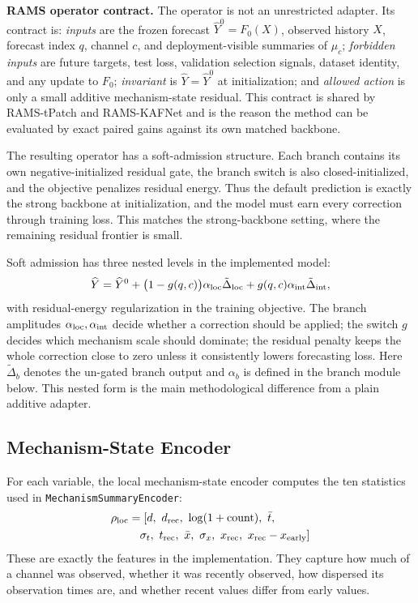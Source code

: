 ﻿\documentclass[10pt,conference]{IEEEtran}
\newcommand{\method}{\textnormal{\mbox{RAMS}}}
\newcommand{\tpatchinst}{\textnormal{\mbox{RAMS-tPatch}}}
\newcommand{\kafinst}{\textnormal{\mbox{RAMS-KAFNet}}}
\begin{document}
\textbf{\method{} operator contract.}
The operator is not an unrestricted adapter.  Its contract is:
\emph{inputs} are the frozen forecast \(\widehat Y^0=F_0(X)\), observed history
\(X\), forecast index \(q\), channel \(c\), and deployment-visible summaries of
\(\mu_c\); \emph{forbidden inputs} are future targets, test loss, validation
selection signals, dataset identity, and any update to \(F_0\);
\emph{invariant} is \(\widehat Y=\widehat Y^0\) at initialization; and
\emph{allowed action} is only a small additive mechanism-state residual.  This
contract is shared by \tpatchinst{} and \kafinst{} and is the reason the method
can be evaluated by exact paired gains against its own matched backbone.

The resulting operator has a soft-admission structure.  Each branch contains
its own negative-initialized residual gate, the
branch switch is also closed-initialized, and the objective penalizes residual
energy.  Thus the default prediction is exactly the strong backbone at
initialization, and the model must earn every correction through training
loss.  This matches the strong-backbone setting, where the remaining residual
frontier is small.

Soft admission has three nested levels in the implemented model:
\begin{equation}
\widehat Y
=\widehat Y^0+
\bigl(1-g(q,c)\bigr)\alpha_{\rm loc}\tilde\Delta_{\rm loc}
+g(q,c)\alpha_{\rm int}\tilde\Delta_{\rm int},
\end{equation}
with residual-energy regularization in the training objective.  The branch
amplitudes \(\alpha_{\rm loc},\alpha_{\rm int}\) decide whether a correction
should be applied; the switch \(g\) decides which mechanism scale should
dominate; the residual penalty keeps the whole correction close to zero unless
it consistently lowers forecasting loss.  Here \(\tilde\Delta_b\) denotes the
un-gated branch output and \(\alpha_b\) is defined in the branch module below.
This nested form is the main methodological difference from a plain additive
adapter.

\subsection{Mechanism-State Encoder}

For each variable, the local mechanism-state encoder computes the ten statistics
used in \texttt{MechanismSummaryEncoder}:
\begin{equation}
\begin{aligned}
\rho_{\rm loc} &= [d,\ d_{\rm rec},\ \log(1+\mathrm{count}),\ \bar t,\\
&\quad \sigma_t,\ t_{\rm rec},\ \bar x,\ \sigma_x,\ x_{\rm rec},\ x_{\rm rec}-x_{\rm early}]
\end{aligned}
\end{equation}
These are exactly the features in the implementation.  They capture how much
of a channel was observed, whether it was recently observed, how dispersed its
observation times are, and whether recent values differ from early values.
\end{document}
